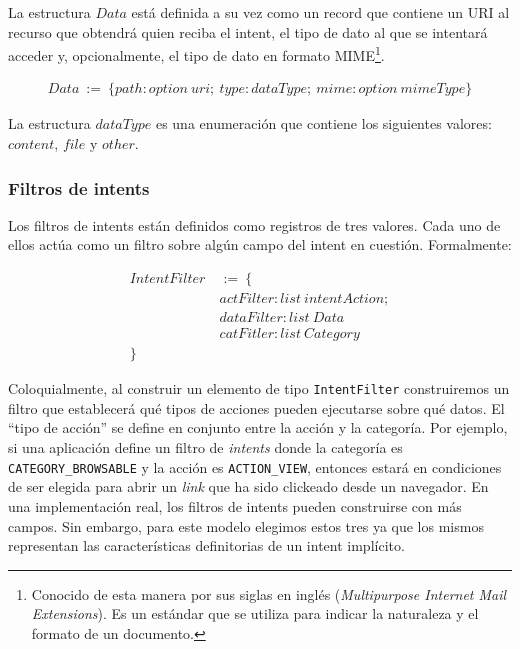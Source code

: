 La estructura $Data$ está definida a su vez como un record que contiene un URI al recurso que
obtendrá quien reciba el intent, el tipo de dato al que se intentará acceder y, opcionalmente, el
tipo de dato en formato MIME\footnote{

    Conocido de esta manera por sus siglas en inglés (\textit{Multipurpose Internet Mail
        Extensions}). Es un estándar que se utiliza para indicar la naturaleza y el formato de un
    documento.

}.

\begin{align*}
    Data\ :=\ \{ path: option\ uri;\ type: dataType;\ mime: option\ mimeType \}
\end{align*}

La estructura $dataType$ es una enumeración que contiene los siguientes valores: $content$, $file$ y
$other$.

\subsubsection*{Filtros de intents}
Los filtros de intents están definidos como registros de tres valores. Cada uno de ellos actúa como
un filtro sobre algún campo del intent en cuestión. Formalmente:

\begin{align*}
    IntentFilter\  & :=\ \{                         \\
                   & actFilter: list\ intentAction; \\
                   & dataFilter: list\ Data         \\
                   & catFitler: list\ Category      \\
    \}
\end{align*}

Coloquialmente, al construir un elemento de tipo \texttt{IntentFilter} construiremos un filtro que
establecerá qué tipos de acciones pueden ejecutarse sobre qué datos. El ``tipo de acción'' se define
en conjunto entre la acción y la categoría. Por ejemplo, si una aplicación define un filtro de
\textit{intents} donde la categoría es \texttt{CATEGORY\_BROWSABLE} y la acción es
\texttt{ACTION\_VIEW}, entonces estará en condiciones de ser elegida para abrir un \textit{link} que
ha sido clickeado desde un navegador. En una implementación real, los filtros de intents pueden
construirse con más campos. Sin embargo, para este modelo elegimos estos tres ya que los mismos
representan las características definitorias de un intent implícito\cite{android-intents}.

